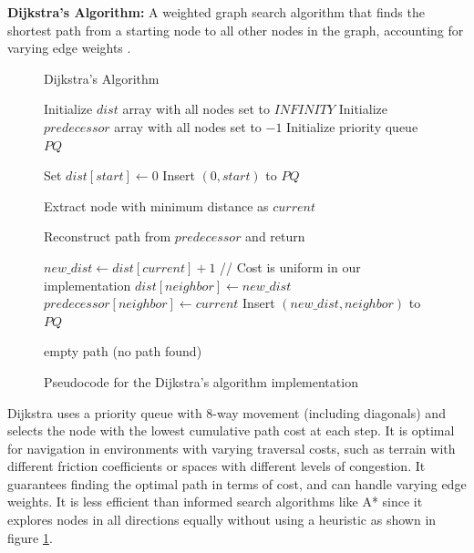 \documentclass{CSSRforAfrica}
\begin{document}
\noindent \textbf{Dijkstra's Algorithm:} A weighted graph search algorithm that finds the shortest path from a starting node to all other nodes in the graph, accounting for varying edge weights \cite{Dijkstra1959}.
\begin{figure}[H]
	\centering
	\begin{minipage}{0.8\textwidth}
		\begin{algorithm}[H]
			\caption{Dijkstra's Algorithm}
			\begin{algorithmic}[1]
				\State Initialize $dist$ array with all nodes set to $INFINITY$
				\State Initialize $predecessor$ array with all nodes set to $-1$
				\State Initialize priority queue $PQ$
				
				\State Set $dist[start] \gets 0$
				\State Insert $(0, start)$ to $PQ$
				
				\State Extract node with minimum distance as $current$
				
				\State Reconstruct path from $predecessor$ and return
				\EndIf
				
				\State $new\_dist \gets dist[current] + 1$  // Cost is uniform in our implementation
				\State $dist[neighbor] \gets new\_dist$
				\State $predecessor[neighbor] \gets current$
				\State Insert $(new\_dist, neighbor)$ to $PQ$
				\EndIf
				\EndFor
				\EndWhile
				
				\State \Return empty path (no path found)
				\EndFunction
			\end{algorithmic}
		\end{algorithm}
	\end{minipage}
	\caption{Pseudocode for the Dijkstra's algorithm implementation}
	\label{alg:dijkstra}
\end{figure}


\noindent Dijkstra uses a priority queue with 8-way movement (including diagonals) and selects the node with the lowest cumulative path cost at each step. It is optimal for navigation in environments with varying traversal costs, such as terrain with different friction coefficients or spaces with different levels of congestion. It guarantees finding the optimal path in terms of cost, and can handle varying edge weights. It is less efficient than informed search algorithms like A* since it explores nodes in all directions equally without using a heuristic as shown in figure \ref{alg:dijkstra}.\\
\end{document}

